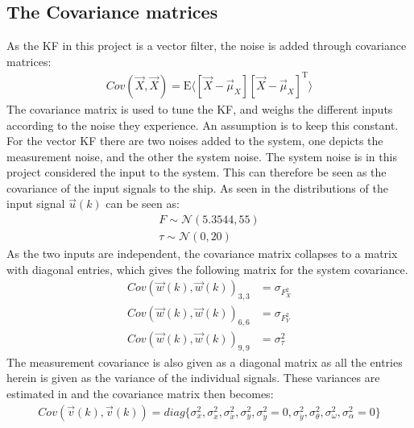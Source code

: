 
\subsection{The Covariance matrices}
As the \ac{KF} in this project is a vector filter, the noise is added through covariance matrices:
\begin{align}
Cov(\vec{X},\vec{X}) = \text{E}\langle[\vec{X} - \vec{\mu}_X][\vec{X} - \vec{\mu}_X]^\text{T}\rangle \label{eq:covar}
\end{align}
The covariance matrix is used to tune the \ac{KF}, and weighs the different inputs according to the noise they experience. An assumption is to keep this constant. For the vector \ac{KF} there are two noises added to the system, one depicts the measurement noise, and the other the system noise. The system noise is in this project considered the input to the system. This can therefore be seen as the covariance of the input signals to the ship. As seen in  the distributions of the input signal $\vec{u}(k)$ can be seen as:
\begin{align}
F \sim \mathcal{N}(5.3544,55)\\
\tau \sim \mathcal{N}(0,20)
\end{align}
As the two inputs are independent, the covariance matrix collapses to a matrix with diagonal entries, which gives the following matrix for the system covariance. 
\begin{align}
Cov(\vec{w}(k),\vec{w}(k))_{3,3} &= \sigma_{F}_X^2\\
Cov(\vec{w}(k),\vec{w}(k))_{6,6} &= \sigma_{F}_Y^2\\
Cov(\vec{w}(k),\vec{w}(k))_{9,9} &= \sigma_{\tau}^2
\end{align}
The measurement covariance is also given as a diagonal matrix as all the entries herein is given as the variance of the individual signals. These variances are estimated in  and the covariance matrix then becomes:
\begin{align}
Cov(\vec{v}(k),\vec{v}(k)) = diag\{\sigma_{x}^2,\sigma_{\dot{x}}^2,\sigma_{\ddot{x}}^2,\sigma_{y}^2,\sigma_{\dot{y}}^2 = 0,\sigma_{\ddot{y}}^2,\sigma_{\theta}^2,\sigma_{\omega}^2,\sigma_{\alpha}^2 = 0\}
\end{align}

